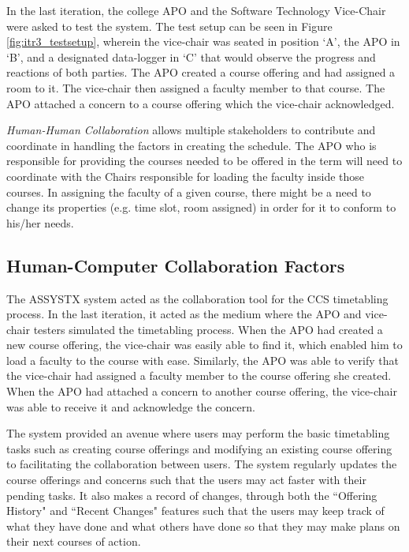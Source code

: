 In the last iteration, the college APO and the Software Technology Vice-Chair were asked to test the system. The test setup can be seen in Figure \ref{fig:itr3_testsetup}, wherein the vice-chair was seated in position `A', the APO in `B', and a designated data-logger in `C' that would observe the progress and reactions of both parties. The APO created a course offering and had assigned a room to it. The vice-chair then assigned a faculty member to that course. The APO attached a concern to a course offering which the vice-chair acknowledged.


\textit{Human-Human Collaboration} allows multiple stakeholders to contribute and coordinate in handling the factors in creating the schedule. The APO who is responsible for providing the courses needed to be offered in the term will need to coordinate with the Chairs responsible for loading the faculty inside those courses. In assigning the faculty of a given course, there might be a need to change its properties (e.g. time slot, room assigned) in order for it to conform to his/her needs.


\subsection{Human-Computer Collaboration Factors}
The ASSYSTX system acted as the collaboration tool for the CCS timetabling process. In the last iteration, it acted as the medium where the APO and vice-chair testers simulated the timetabling process. When the APO had created a new course offering, the vice-chair was easily able to find it, which enabled him to load a faculty to the course with ease. Similarly, the APO was able to verify that the vice-chair had assigned a faculty member to the course offering she created. When the APO had attached a concern to another course offering, the vice-chair was able to receive it and acknowledge the concern. 

The system provided an avenue where users may perform the basic timetabling tasks such as creating course offerings and modifying an existing course offering to facilitating the collaboration between users. The system regularly updates the course offerings and concerns such that the users may act faster with their pending tasks. It also makes a record of changes, through both the ``Offering History" and ``Recent Changes" features such that the users may keep track of what they have done and what others have done so that they may make plans on their next courses of action. 

